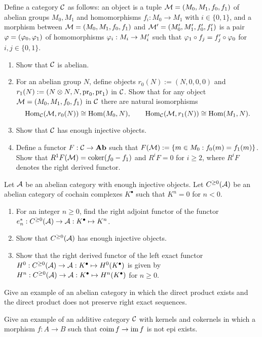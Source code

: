 \documentclass{../../../small}
\begin{document}
\begin{prb}
Define a category $\mathcal{C}$ as follows: an object is a tuple $\mathcal{M}=(M_0,M_1,f_0,f_1)$ of abelian groups $M_0,M_1$ and homomorphisms $f_i:M_0\to M_1$ with $i\in\{0,1\}$, and a morphism between $\mathcal{M}=(M_0,M_1,f_0,f_1)$ and $\mathcal{M}'=(M_0',M_1',f_0',f_1')$ is a pair $\varphi=(\varphi_0,\varphi_1)$ of homomorphisms $\varphi_i:M_i\to M_i'$ such that $\varphi_1\circ f_j=f_j'\circ\varphi_0$ for $i,j\in\{0,1\}$.
\begin{enumerate}[(1)]
\item Show that $\mathcal{C}$ is abelian.
\item For an abelian group $N$, define objects $r_0(N):=(N,0,0,0)$ and $r_1(N):=(N\otimes N,N,\operatorname{pr}_0,\operatorname{pr}_1)$ in $\mathcal{C}$. Show that for any object $\mathcal{M}=(M_0,M_1,f_0,f_1)$ in $\mathcal{C}$ there are natural isomorphisms
\[\operatorname{Hom}_{\mathcal{C}}(\mathcal{M},r_0(N))\cong\operatorname{Hom}(M_0,N),\qquad\operatorname{Hom}_{\mathcal{C}}(\mathcal{M},r_1(N))\cong\operatorname{Hom}(M_1,N).\]
\item Show that $\mathcal{C}$ has enough injective objects.
\item Define a functor $F:\mathcal{C}\to\mathbf{Ab}$ such that $F(\mathcal{M}):=\{m\in M_0:f_0(m)=f_1(m)\}$. Show that $R^1F(\mathcal{M})=\operatorname{coker}(f_0-f_1)$ and $R^iF=0$ for $i\ge2$, where $R^iF$ denotes the right derived functor.
\end{enumerate}
\end{prb}
\begin{sol}
\end{sol}

\begin{prb}
Let $\mathcal{A}$ be an abelian category with enough injective objects.
Let $C^{\ge0}(\mathcal{A})$ be an abelian category of cochain complexes $K^\bullet$ such that $K^n=0$ for $n<0$.
\begin{enumerate}[(1)]
\item For an integer $n\ge0$, find the right adjoint functor of the functor $e_n^*:C^{\ge0}(\mathcal{A})\to\mathcal{A}:K^\bullet\mapsto K^n$.
\item Show that $C^{\ge0}(\mathcal{A})$ has enough injective objects.
\item Show that the right derived functor of the left exact functor $H^0:C^{\ge0}(\mathcal{A})\to\mathcal{A}:K^\bullet\mapsto H^0(K^\bullet)$ is given by $H^n:C^{\ge0}(\mathcal{A})\to\mathcal{A}:K^\bullet\mapsto H^n(K^\bullet)$ for $n\ge0$.
\end{enumerate}
\end{prb}
\begin{sol}
\end{sol}

\begin{prb}
Give an example of an abelian category in which the direct product exists and the direct product does not preserve right exact sequences.
\end{prb}
\begin{sol}
\end{sol}

\begin{prb}
Give an example of an additive category $\mathcal{C}$ with kernels and cokernels in which a morphism $f:A\to B$ such that $\operatorname{coim}f\to\operatorname{im} f$ is not epi exists.
\end{prb}
\begin{sol}

\end{sol}
\end{document}

